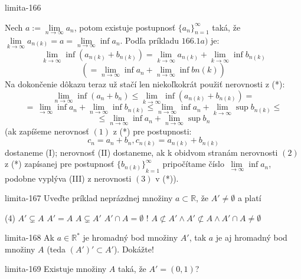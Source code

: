 \begin{defproblem}{limita-166}
\begin{solution}
    Nech $a:=\lim\limits_{n \rightarrow \infty} a_n$, potom existuje postupnosť
    ${\{a_n\}}_{n=1}^\infty$ taká, že $\lim\limits_{k \rightarrow \infty}
    a_{n(k)}=a=\lim\limits_{n \rightarrow \infty} \inf a_n$. Podľa príkladu
    $166.1a)$ je:
    \[
        \lim\limits_{k \rightarrow \infty} \inf (a_{n(k)}+b_{n(k)}) =
        \lim\limits_{k \rightarrow \infty} a_{n(k)}+\lim\limits_{k \rightarrow
        \infty}
        \inf b_{n(k)}
    \]
    \[
        (=\lim\limits_{n \rightarrow \infty}
        \inf a_n + \lim\limits_{n \rightarrow \infty} \inf b{n(k)})
    \]
    Na dokončenie dôkazu teraz už stačí len niekoľkokrát použiť nerovnosti z
    (*):
    \[
        \lim\limits_{n \rightarrow \infty} \inf (a_n+b_n)
        \leq \lim\limits_{k \rightarrow \infty} \inf (a_{n(k)}+b_{n(k)})
        =
    \]
    \[
        = \lim\limits_{\rightarrow \infty} \inf a_n
            + \lim\limits_{n \rightarrow \infty} \inf b_{n(k)}
            \leq \lim\limits_{n \rightarrow \infty} \inf a_n
            + \lim\limits_{k \rightarrow \infty} \sup b_{n(k)}
        \leq
    \]
    \[
        \leq \lim\limits_{n \rightarrow \infty} \inf a_n
            +\lim\limits_{n \rightarrow \infty} \sup b_n
    \]
    (ak zapíšeme nerovnosť $(1)$ z (*) pre postupnosti:
    \[ c_n=a_n+b_n,c_{n(k)}=a_{n(k)}+b_{n(k)} \]
    dostaneme (I); nerovnosť (II) dostaneme, ak k obidvom stranám nerovnosti
    $(2)$ z (*) zapísanej pre postupnosť ${\{b_{n(k)}\}}_{k=1}^\infty$
    pripočítame číslo $\lim\limits_{\rightarrow \infty} \inf a_n$, podobne
    vyplýva (III) z nerovnosti $(3)$ v (*)).
\end{solution}
\end{defproblem}

\begin{defproblem}{limita-167}
Uveďte príklad neprázdnej množiny $a \subset \mathbb{R}$, že $A' \neq \emptyset$
a platí
\begin{tasks}(4)
\task $A' \subsetneq A$
\task $A'=A$
\task $A \subsetneq A'$
\task $A' \cap A = \emptyset$
\task! $A \not\subset A'\wedge A' \not\subset A \wedge A' \cap A \neq\emptyset$
\end{tasks}
\end{defproblem}

\begin{defproblem}{limita-168}
Ak $a \in \mathbb{R^*}$ je hromadný bod množiny $A'$, tak $a$ je aj hromadný bod
množiny $A$ (teda $(A')' \subset A'$). Dokážte!
\end{defproblem}

\begin{defproblem}{limita-169}
Existuje množiny $A$ taká, že $A'=(0,1)$?
\end{defproblem}


